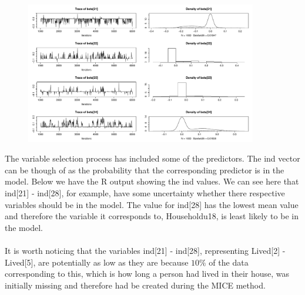 \documentclass{article}
\begin{document}
\begin{figure}[H]
\centering
\includegraphics[width = 0.9\textwidth]{notIncludedBetas.pdf}
\caption{}
\label{notIncluded}
\end{figure}
\noindent The variable selection process has included some of the predictors. The \textsf{ind} vector can be though of as the probability that the corresponding predictor is in the model. Below we have the \textsf{R} output showing the \textsf{ind} values. We can see here that \textsf{ind[21] - ind[28]}, for example, have some uncertainty whether there respective variables should be in the model. The value for \textsf{ind[28]} has the lowest mean value and therefore the variable it corresponds to, \textsf{Householdu18}, is least likely to be in the model. 
\\\\
It is worth noticing that the variables \textsf{ind[21] - ind[28]}, representing Lived[2] - Lived[5], are potentially as low as they are because $10\%$ of the data corresponding to this, which is how long a person had lived in their house, was initially missing and therefore had be created during the MICE method.
\end{document}
